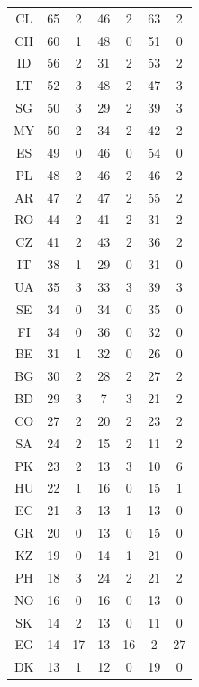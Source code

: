 {\begin{table}[ht]
\begin{adjustbox}{width=\textwidth}
\begin{tabular}{c|cc|cc|cc}
                CL & 65 & 2 & 46 & 2 & 63 & 2\\
                CH & 60 & 1 & 48 & 0 & 51 & 0\\
                ID & 56 & 2 & 31 & 2 & 53 & 2\\
                LT & 52 & 3 & 48 & 2 & 47 & 3\\
                SG & 50 & 3 & 29 & 2 & 39 & 3\\
                MY & 50 & 2 & 34 & 2 & 42 & 2\\
                ES & 49 & 0 & 46 & 0 & 54 & 0\\
                PL & 48 & 2 & 46 & 2 & 46 & 2\\
                AR & 47 & 2 & 47 & 2 & 55 & 2\\
                RO & 44 & 2 & 41 & 2 & 31 & 2\\
                CZ & 41 & 2 & 43 & 2 & 36 & 2\\
                IT & 38 & 1 & 29 & 0 & 31 & 0\\
                UA & 35 & 3 & 33 & 3 & 39 & 3\\
                SE & 34 & 0 & 34 & 0 & 35 & 0\\
                FI & 34 & 0 & 36 & 0 & 32 & 0\\
                BE & 31 & 1 & 32 & 0 & 26 & 0\\
                BG & 30 & 2 & 28 & 2 & 27 & 2\\
                BD & 29 & 3 & 7 & 3 & 21 & 2\\
                CO & 27 & 2 & 20 & 2 & 23 & 2\\
                SA & 24 & 2 & 15 & 2 & 11 & 2\\
                PK & 23 & 2 & 13 & 3 & 10 & 6\\
                HU & 22 & 1 & 16 & 0 & 15 & 1\\
                EC & 21 & 3 & 13 & 1 & 13 & 0\\
                GR & 20 & 0 & 13 & 0 & 15 & 0\\
                KZ & 19 & 0 & 14 & 1 & 21 & 0\\
                PH & 18 & 3 & 24 & 2 & 21 & 2\\
                NO & 16 & 0 & 16 & 0 & 13 & 0\\
                SK & 14 & 2 & 13 & 0 & 11 & 0\\
                EG & 14 & 17 & 13 & 16 & 2 & 27\\
                DK & 13 & 1 & 12 & 0 & 19 & 0\\

\end{tabular}
\end{adjustbox}
\end{table}}
